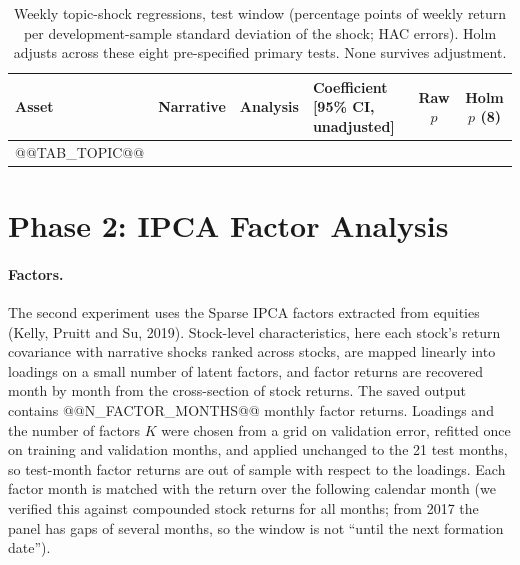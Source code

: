 \documentclass[11pt]{article}
\begin{document}
\begin{table}[t]
\centering\small
\begin{tabular}{@{}llllcc@{}}
\toprule
Asset & Narrative & Analysis & Coefficient [95\% CI, unadjusted] & Raw $p$ & Holm $p$ (8) \\
\midrule
@@TAB_TOPIC@@
\bottomrule
\end{tabular}
\caption{Weekly topic-shock regressions, test window (percentage points of weekly return per development-sample standard deviation of the shock; HAC errors). Holm adjusts across these eight pre-specified primary tests. None survives adjustment.}
\label{tab:topic}
\end{table}

\section{Phase 2: IPCA Factor Analysis}
\label{sec:phase2}

\paragraph{Factors.} The second experiment uses the Sparse IPCA factors extracted from equities (Kelly, Pruitt and Su, 2019). Stock-level characteristics, here each stock's return covariance with narrative shocks ranked across stocks, are mapped linearly into loadings on a small number of latent factors, and factor returns are recovered month by month from the cross-section of stock returns. The saved output contains @@N_FACTOR_MONTHS@@ monthly factor returns. Loadings and the number of factors $K$ were chosen from a grid on validation error, refitted once on training and validation months, and applied unchanged to the 21 test months, so test-month factor returns are out of sample with respect to the loadings. Each factor month is matched with the return over the following calendar month (we verified this against compounded stock returns for all months; from 2017 the panel has gaps of several months, so the window is not ``until the next formation date'').
\end{document}
